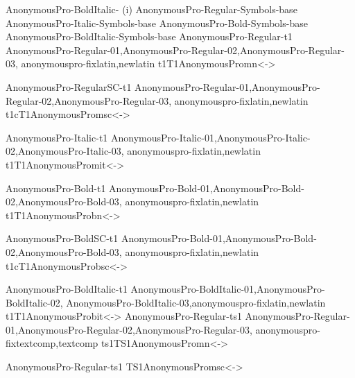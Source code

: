   \transformfont
    {AnonymousPro-BoldItalic-}%
    {}
\endfor(i)
\transformfont
  {AnonymousPro-Regular-Symbols-base}%
  {}
\transformfont
  {AnonymousPro-Italic-Symbols-base}%
  {}
\transformfont
  {AnonymousPro-Bold-Symbols-base}%
  {}
\transformfont
  {AnonymousPro-BoldItalic-Symbols-base}%
  {}
\installfonts
{}
\installfont
  {AnonymousPro-Regular-t1}%
  {AnonymousPro-Regular-01,AnonymousPro-Regular-02,AnonymousPro-Regular-03,%
    anonymouspro-fixlatin,newlatin}%
  {t1}{T1}{AnonymousPro}{m}{n}{<->\string\ANP@@scale}

\installfont
  {AnonymousPro-RegularSC-t1}%
  {AnonymousPro-Regular-01,AnonymousPro-Regular-02,AnonymousPro-Regular-03,%
    anonymouspro-fixlatin,newlatin}%
  {t1c}{T1}{AnonymousPro}{m}{sc}{<->\string\ANP@@scale}

\installfont
  {AnonymousPro-Italic-t1}%
  {AnonymousPro-Italic-01,AnonymousPro-Italic-02,AnonymousPro-Italic-03,%
    anonymouspro-fixlatin,newlatin}%
  {t1}{T1}{AnonymousPro}{m}{it}{<->\string\ANP@@scale}

\installfont
  {AnonymousPro-Bold-t1}%
  {AnonymousPro-Bold-01,AnonymousPro-Bold-02,AnonymousPro-Bold-03,%
    anonymouspro-fixlatin,newlatin}%
  {t1}{T1}{AnonymousPro}{b}{n}{<->\string\ANP@@scale}

\installfont
  {AnonymousPro-BoldSC-t1}%
  {AnonymousPro-Bold-01,AnonymousPro-Bold-02,AnonymousPro-Bold-03,%
    anonymouspro-fixlatin,newlatin}%
  {t1c}{T1}{AnonymousPro}{b}{sc}{<->\string\ANP@@scale}

\installfont
  {AnonymousPro-BoldItalic-t1}%
  {AnonymousPro-BoldItalic-01,AnonymousPro-BoldItalic-02,%
    AnonymousPro-BoldItalic-03,anonymouspro-fixlatin,newlatin}%
  {t1}{T1}{AnonymousPro}{b}{it}{<->\string\ANP@@scale}
\endinstallfonts
\installfonts
{}
\installfont
  {AnonymousPro-Regular-ts1}%
  {AnonymousPro-Regular-01,AnonymousPro-Regular-02,AnonymousPro-Regular-03,%
    anonymouspro-fixtextcomp,textcomp}%
  {ts1}{TS1}{AnonymousPro}{m}{n}{<->\string\ANP@@scale}

\installfontas
  {AnonymousPro-Regular-ts1}%
  {TS1}{AnonymousPro}{m}{sc}{<->\string\ANP@@scale}

